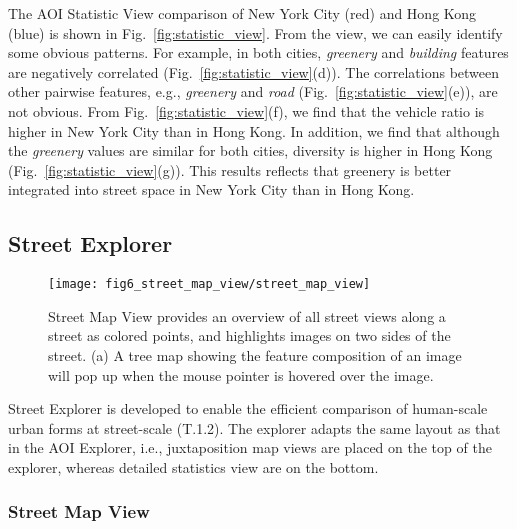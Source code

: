 The AOI Statistic View comparison of New York City (red) and Hong Kong (blue) is shown in Fig.~\ref{fig:statistic_view}.
From the view, we can easily identify some obvious patterns.
For example, in both cities, \textit{greenery} and \textit{building} features are negatively correlated (Fig.~\ref{fig:statistic_view}(d)).
The correlations between other pairwise features, e.g., \textit{greenery} and \textit{road} (Fig.~\ref{fig:statistic_view}(e)), are not obvious.
From Fig.~\ref{fig:statistic_view}(f), we find that the vehicle ratio is higher in New York City than in Hong Kong.
In addition, we find that although the \textit{greenery} values are similar for both cities, diversity is higher in Hong Kong (Fig.~\ref{fig:statistic_view}(g)).
This results reflects that greenery is better integrated into street space in New York City than in Hong Kong.

\subsection{Street Explorer}
\label{ssec:street_explorer}

\begin{figure}[t] 
	\centering
	\texttt{[image: fig6\_street\_map\_view/street\_map\_view]}
	\vspace{-3mm}
	\caption{Street Map View provides an overview of all street views along a street as colored points, and highlights images on two sides of the street.
	(a) A tree map showing the feature composition of an image will pop up when the mouse pointer is hovered over the image.}
	\label{fig:street_map}
	\vspace{-5mm}
\end{figure}


Street Explorer is developed to enable the efficient comparison of human-scale urban forms at street-scale (T.1.2). 
The explorer adapts the same layout as that in the AOI Explorer, i.e., juxtaposition map views are placed on the top of the explorer, whereas detailed statistics view are on the bottom. 

\subsubsection{Street Map View}
\label{sssec:street_view}

